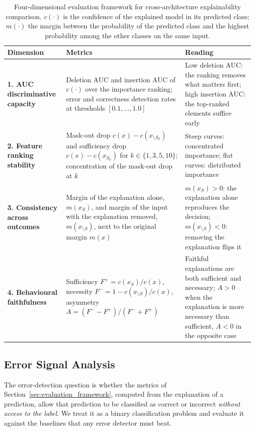 \documentclass[preprint, times, review, 10pt]{elsarticle}
\begin{document}
\begin{table}[!tbp]
\centering
\scriptsize
\setlength{\tabcolsep}{4pt}
\renewcommand{\arraystretch}{1.1}
\caption{Four-dimensional evaluation framework for cross-architecture explainability comparison. \(c(\cdot)\) is the confidence of the explained model in its predicted class; \(m(\cdot)\) the margin between the probability of the predicted class and the highest probability among the other classes on the same input.}
\label{tab:evaluation_dimensions}
\begin{tabular}{@{}p{}p{}p{}@{}}
\toprule
\textbf{Dimension} & \textbf{Metrics} & \textbf{Reading} \\
\midrule
\textbf{1. AUC discriminative capacity}
& Deletion AUC and insertion AUC of \(c(\cdot)\) over the importance ranking; error and correctness detection rates at thresholds \([0.1,\ldots,1.0]\)
& Low deletion AUC: the ranking removes what matters first; high insertion AUC: the top-ranked elements suffice early \\
\midrule
\textbf{2. Feature ranking stability}
& Mask-out drop \(c(x)-c(x_{\setminus S_k})\) and sufficiency drop \(c(x)-c(x_{S_k})\) for \(k\in\{1,3,5,10\}\); concentration of the mask-out drop at \(k\)
& Steep curves: concentrated importance; flat curves: distributed importance \\
\midrule
\textbf{3. Consistency across outcomes}
& Margin of the explanation alone, \(m(x_S)\), and margin of the input with the explanation removed, \(m(x_{\setminus S})\), next to the original margin \(m(x)\)
& \(m(x_S)>0\): the explanation alone reproduces the decision; \(m(x_{\setminus S})<0\): removing the explanation flips it \\
\midrule
\textbf{4. Behavioural faithfulness}
& Sufficiency \(F^{+}=c(x_S)/c(x)\), necessity \(F^{-}=1-c(x_{\setminus S})/c(x)\), asymmetry \(A=(F^{-}-F^{+})/(F^{-}+F^{+})\)
& Faithful explanations are both sufficient and necessary; \(A>0\) when the explanation is more necessary than sufficient, \(A<0\) in the opposite case \\
\bottomrule
\end{tabular}
\end{table}

\subsection{Error Signal Analysis} \label{logistic_regression}

The error-detection question is whether the metrics of Section~\ref{sec:evaluation_framework}, computed from the explanation of a prediction, allow that prediction to be classified as correct or incorrect \emph{without access to the label}. We treat it as a binary classification problem and evaluate it against the baselines that any error detector must beat.
\end{document}

